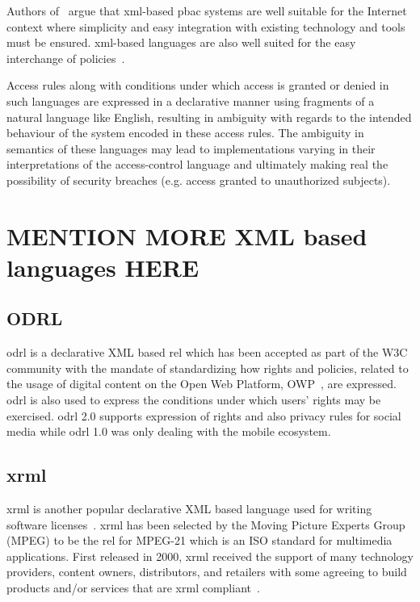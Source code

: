Authors of~\cite{ArdagnaDVS04} argue that \ac{xml}-based \ac{pbac} systems are well suitable for the Internet context where simplicity and easy integration with existing technology and tools must be ensured. \ac{xml}-based languages are also well suited for the easy interchange of policies~\cite{ArdagnaDVS04}. 

Access rules along with conditions under which access is granted or denied in such languages are expressed in a declarative manner using fragments of a natural language like English, resulting in ambiguity with regards to the intended behaviour of the system encoded in these access rules. The ambiguity in semantics of these languages may lead to implementations varying in their interpretations of the access-control language and ultimately making real the possibility of security breaches (e.g. access granted to unauthorized subjects). 

\section{MENTION MORE XML based languages HERE}

\subsection{ODRL}

\ac{odrl} is a declarative XML based \ac{rel} which has been accepted as part of the W3C community with the mandate of standardizing how rights and policies, related to the usage of digital content on the Open Web Platform, OWP~\cite{openwebplatform}, are expressed. \ac{odrl} is also used to express the conditions under which users' rights may be exercised. \ac{odrl} 2.0 supports expression of rights and also privacy rules for social media while \ac{odrl} 1.0 was only dealing with the mobile ecosystem. 

\subsection{xrml}
\ac{xrml} is another popular declarative XML based language used for writing software licenses~\cite{HalpernW08}. \ac{xrml} has been selected by the Moving Picture Experts Group (MPEG) to be the \ac{rel} for MPEG-21 which is an ISO standard for multimedia applications. First released in 2000, \ac{xrml} received the support of many technology providers, content owners, distributors, and retailers with some agreeing to build products and/or services that are \ac{xrml} compliant~\cite{HalpernW08}.

